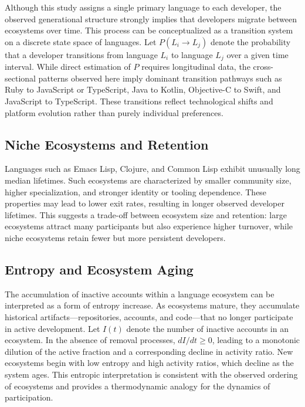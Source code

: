 \documentclass[12pt,a4paper]{article}
\begin{document}
Although this study assigns a single primary language to each developer, the observed generational structure strongly implies that developers migrate between ecosystems over time. This process can be conceptualized as a transition system on a discrete state space of languages. Let $P(L_i \to L_j)$ denote the probability that a developer transitions from language $L_i$ to language $L_j$ over a given time interval. While direct estimation of $P$ requires longitudinal data, the cross-sectional patterns observed here imply dominant transition pathways such as Ruby to JavaScript or TypeScript, Java to Kotlin, Objective-C to Swift, and JavaScript to TypeScript. These transitions reflect technological shifts and platform evolution rather than purely individual preferences.

\subsection{Niche Ecosystems and Retention}

Languages such as Emacs Lisp, Clojure, and Common Lisp exhibit unusually long median lifetimes. Such ecosystems are characterized by smaller community size, higher specialization, and stronger identity or tooling dependence. These properties may lead to lower exit rates, resulting in longer observed developer lifetimes. This suggests a trade-off between ecosystem size and retention: large ecosystems attract many participants but also experience higher turnover, while niche ecosystems retain fewer but more persistent developers.

\subsection{Entropy and Ecosystem Aging}

The accumulation of inactive accounts within a language ecosystem can be interpreted as a form of entropy increase. As ecosystems mature, they accumulate historical artifacts---repositories, accounts, and code---that no longer participate in active development. Let $I(t)$ denote the number of inactive accounts in an ecosystem. In the absence of removal processes, $dI/dt \geq 0$, leading to a monotonic dilution of the active fraction and a corresponding decline in activity ratio. New ecosystems begin with low entropy and high activity ratios, which decline as the system ages. This entropic interpretation is consistent with the observed ordering of ecosystems and provides a thermodynamic analogy for the dynamics of participation.
\end{document}
